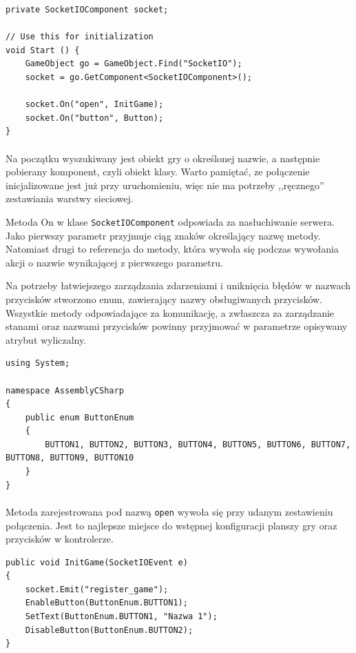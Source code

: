 \begin{lstlisting}[language=CSharp]
private SocketIOComponent socket;

// Use this for initialization
void Start () {
	GameObject go = GameObject.Find("SocketIO");
	socket = go.GetComponent<SocketIOComponent>();

	socket.On("open", InitGame);
	socket.On("button", Button);
}
\end{lstlisting}

\paragraph{}
Na początku wyszukiwany jest obiekt gry o określonej nazwie, a następnie pobierany komponent, czyli obiekt klasy. Warto pamiętać, ze połączenie inicjalizowane jest już przy uruchomieniu, więc nie ma potrzeby ,,ręcznego'' zestawiania warstwy sieciowej.

Metoda On w klase \texttt{SocketIOComponent} odpowiada za nasłuchiwanie serwera. Jako pierwszy parametr przyjmuje ciąg znaków określający nazwę metody. Natomiast drugi to referencja do metody, która wywoła się podczas wywołania akcji o nazwie wynikającej z pierwszego parametru.

Na potrzeby łatwiejszego zarządzania zdarzeniami i uniknięcia błędów w nazwach przycisków stworzono enum, zawierający nazwy obsługiwanych przycisków. Wszystkie metody odpowiadające za komunikację, a zwłaszcza za zarządzanie stanami oraz nazwami przycisków powinny przyjmować w parametrze opisywany atrybut wyliczalny.

\begin{lstlisting}[language=CSharp]
using System;

namespace AssemblyCSharp
{
	public enum ButtonEnum
	{
		BUTTON1, BUTTON2, BUTTON3, BUTTON4, BUTTON5, BUTTON6, BUTTON7, BUTTON8, BUTTON9, BUTTON10
	}
}

\end{lstlisting}

\paragraph{}
Metoda zarejestrowana pod nazwą \texttt{open} wywoła się przy udanym zestawieniu połączenia. Jest to najlepsze miejsce do wstępnej konfiguracji planszy gry oraz przycisków w kontrolerze.

\begin{lstlisting}[language=CSharp]
public void InitGame(SocketIOEvent e)
{
	socket.Emit("register_game");
	EnableButton(ButtonEnum.BUTTON1);
	SetText(ButtonEnum.BUTTON1, "Nazwa 1");
	DisableButton(ButtonEnum.BUTTON2);
}
\end{lstlisting}

